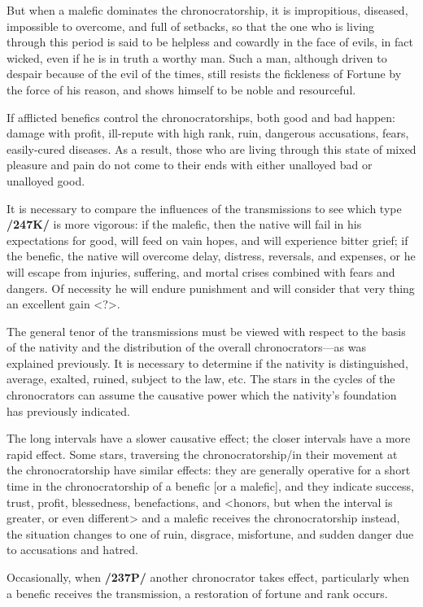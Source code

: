 But when a malefic dominates the chronocratorship, it is impropitious, diseased, impossible to overcome, and full of setbacks, so that the one who is living through this period is said to be helpless and cowardly in the face of evils, in fact wicked, even if he is in truth a worthy man. Such a man, although driven to despair because of the evil of the times, still resists the fickleness of Fortune by the force of his
reason, and shows himself to be noble and resourceful. 

If \mnbm afflicted benefics control the chronocratorships, both good and bad happen: damage with profit, ill-repute with high rank, ruin, dangerous accusations, fears, easily-cured diseases. As a result, those who are living through this state of mixed pleasure and pain do not come to their ends with either unalloyed bad or unalloyed good.

It is necessary to compare the influences of the transmissions to see which type \textbf{/247K/} is more vigorous: if the malefic, then the native will fail in his expectations for good, will feed on vain hopes, and
will experience bitter grief; if the benefic, the native will overcome delay, distress, reversals, and expenses, or he will escape from injuries, suffering, and mortal crises combined with fears and dangers. Of necessity he will endure punishment and will consider that very thing an excellent gain <?>. 

The  general tenor of the transmissions must be viewed with respect to the basis of the nativity and the distribution of the overall chronocrators—as was explained previously. It is necessary to determine if the nativity is distinguished, average, exalted, ruined, subject to the law, etc. The stars in the cycles of the chronocrators can assume the
causative power which the nativity’s foundation has previously indicated.

The long intervals have a slower causative effect; the closer intervals have a more rapid effect. Some stars, traversing the chronocratorship/in their movement at the chronocratorship have similar effects: they
are generally operative for a short time in the chronocratorship of a benefic [or a malefic], and they indicate success, trust, profit, blessedness, benefactions, and <honors, but when the interval is greater, or even different> and a malefic receives the chronocratorship instead, the situation changes to one of ruin, disgrace,
misfortune, and sudden danger due to accusations and hatred. 

Occasionally, when \textbf{/237P/} another chronocrator takes effect, particularly when a benefic receives the transmission, a restoration of fortune and rank occurs. 


